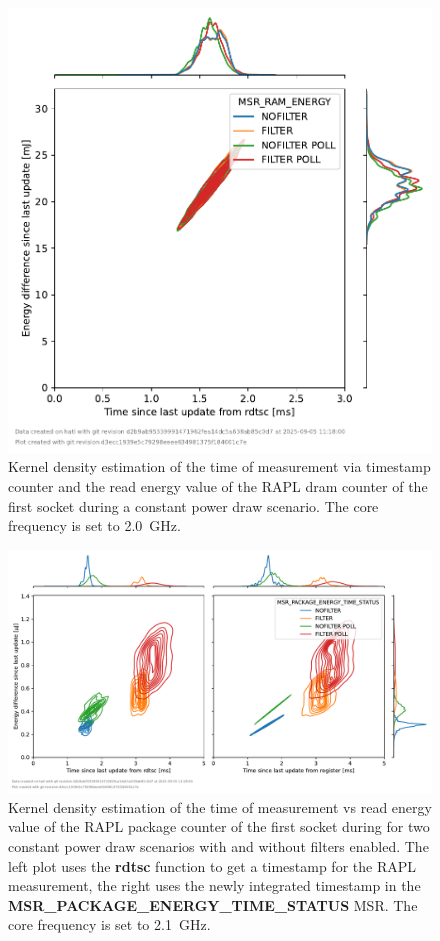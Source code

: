 \begin{figure}[]
    \centering
    \includegraphics[width=0.54\columnwidth]{fig/rapl-update-intervals/MSR_RAM_ENERGY_2000000.pdf}
    \caption{Kernel density estimation of the time of measurement via timestamp counter and the read energy value of the RAPL dram counter of the first socket during a constant power draw scenario.
    The core frequency is set to \SI{2.0}{\GHz}.}
\end{figure}

\clearpage
\begin{figure}[]
    \centering
    \includegraphics[width=\columnwidth]{fig/rapl-update-intervals/MSR_PACKAGE_ENERGY_TIME_STATUS_2100000.pdf}
    \caption{Kernel density estimation of the time of measurement vs read energy value of the RAPL package counter of the first socket during for two constant power draw scenarios with and without filters enabled.
    The left plot uses the \textbf{rdtsc} function to get a timestamp for the RAPL measurement, the right uses the newly integrated timestamp in the \textbf{MSR\_PACKAGE\_ENERGY\_TIME\_STATUS} MSR.
    The core frequency is set to \SI{2.1}{\GHz}.}
\end{figure}

